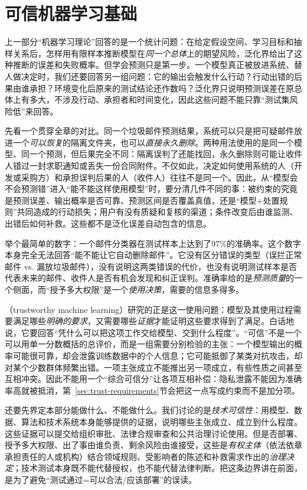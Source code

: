\chapter{可信机器学习基础}
\label{chap:trust-foundations}

上一部分“机器学习理论”回答的是一个统计问题：在给定假设空间、学习目标和抽样关系后，怎样用有限样本推断模型在\emph{同一个总体}上的期望风险，泛化界给出了这种推断的误差和失败概率。但学会预测只是第一步。一个模型真正被放进系统、替人做决定时，我们还要回答另一组问题：它的输出会触发什么行动？行动出错的后果由谁承担？环境变化后原来的测试结论还作数吗？泛化界只说明预测误差在原总体上有多大，不涉及行动、承担者和时间变化，因此这些问题不能只靠“测试集风险低”来回答。

先看一个贯穿全章的对比。同一个垃圾邮件预测结果，系统可以只是把可疑邮件放进一个\emph{可以恢复}的隔离文件夹，也可以\emph{直接永久删除}。两种用法使用的是同一个模型、同一个预测，但后果完全不同：隔离误判了还能找回，永久删除则可能让收件人错过一封求职通知或丢失一份合同附件。不仅如此，决定如何使用系统的人（开发或采购方）和承担误判后果的人（收件人）往往不是同一个。因此，从“模型会不会预测错”进入“能不能这样使用模型”时，要分清几件不同的事：被约束的究竟是预测误差、输出概率是否可靠、预测区间是否覆盖真值，还是“模型+处置规则”共同造成的行动损失；用户有没有质疑和复核的渠道；条件改变后由谁监测、出错后如何补救。这些都不是泛化误差自动包含的信息。

举个最简单的数字：一个邮件分类器在测试样本上达到了97\%的准确率。这个数字本身完全无法回答“能不能让它自动删除邮件”。它没有区分错误的类型（误拦正常邮件 vs. 漏放垃圾邮件），没有说明这两类错误的代价，也没有说明测试样本是否代表未来的邮件、收件人是否有机会发现和纠正误判。准确率给的是\emph{预测质量}的一个侧面，而“授予多大权限”是一个\emph{使用决策}，需要的信息多得多。

（trustworthy machine learning）研究的正是这一使用问题：模型及其使用过程需要满足哪些\emph{明确的要求}，又需要哪些\emph{证据}才能证明这些要求得到了满足。白话地说，它要回答“凭什么可以把这项工作交给模型、交到什么程度”。“可信”不是一个可以用单一分数概括的总评价，而是一组需要分别检验的主张：一个模型输出的概率可能很可靠，却会泄露训练数据中的个人信息；它可能抵御了某类对抗攻击，却对某个少数群体频繁出错。一项主张成立不能推出另一项成立，有些性质之间甚至互相冲突。因此不能用一个“综合可信分”让各项互相补偿：隐私泄露不能因为准确率高就被抵消，第~\ref{sec:trust-requirements}节会把这一点写成约束而不是加分项。

还要先界定本部分能做什么、不能做什么。我们讨论的是\emph{技术可信性}：用模型、数据、算法和技术系统本身能够提供的证据，说明哪些主张成立、成立到什么程度。这些证据可以提交给组织审批、法律合规审查和公共治理讨论使用。但是否部署、授予多大权限、出了事由谁负责、剩余风险由谁接受，这些是\emph{有权主体}（依法依章承担责任的人或机构）结合领域规则、受影响者的陈述和补救需求作出的\emph{治理决定}；技术测试本身既不能代替授权，也不能代替法律判断。把这条边界讲在前面，是为了避免“测试通过=可以合法/应该部署”的误读。

